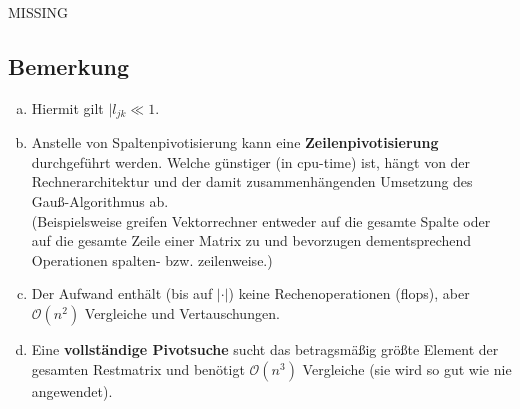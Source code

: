 \documentclass[ngerman,fontsize=11pt, paper=a4, parskip=half, titlepage=true, toc=bib]{scrbook}
\begin{document}
MISSING

\subsection{Bemerkung}
\begin{enumerate}[a)]
	\item Hiermit gilt $|l_{jk} \ll 1$.
	\item Anstelle von Spaltenpivotisierung kann eine \textbf{Zeilenpivotisierung}
	durchgeführt werden.
	Welche günstiger (in cpu-time) ist, hängt von der Rechnerarchitektur und
	der damit zusammenhängenden Umsetzung des Gauß-Algorithmus ab.\\
	(Beispielsweise greifen Vektorrechner entweder auf die gesamte Spalte
	oder auf die gesamte Zeile einer Matrix zu und bevorzugen dementsprechend
	Operationen spalten- bzw. zeilenweise.)
	\item Der Aufwand enthält (bis auf $|\cdot |$) keine Rechenoperationen (flops),
	aber $\mathcal{O}(n^2)$ Vergleiche und Vertauschungen.
	\item Eine \textbf{vollständige Pivotsuche} sucht das betragsmäßig größte Element der gesamten Restmatrix und benötigt $\mathcal{O}(n^3) $ Vergleiche
	(sie wird so gut wie nie angewendet).
\end{enumerate}
\end{document}
